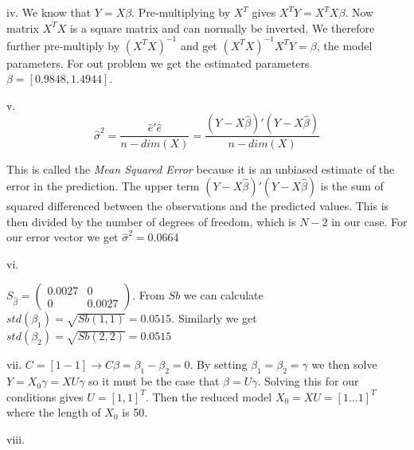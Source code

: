 \documentclass[11pt,a4paper,oneside]{report}
\begin{document}
iv. We know that $Y = X\beta$. Pre-multiplying by $X^T$ gives $X^TY = X^TX\beta$. Now matrix $X^TX$ is a square matrix and can normally be inverted. We therefore further pre-multiply by $(X^TX)^{-1}$ and get $(X^TX)^{-1}X^TY = \beta$, the model parameters. For out problem we get the estimated parameters $\beta = [0.9848, 1.4944]$.

v. $$\hat{\sigma}^2 = \frac{\hat{e}'\hat{e}}{n - dim(X)} = \frac{(Y - X\hat{\beta})'(Y - X\hat{\beta})}{n - dim(X)}$$

This is called the \emph{Mean Squared Error} because it is an unbiased estimate of the error in the prediction. The upper term $(Y - X\hat{\beta})'(Y - X\hat{\beta})$ is the sum of squared differenced between the observations and the predicted values. This is then divided by the number of degrees of freedom, which is $N - 2$ in our case. For our error vector we get $\hat{\sigma}^2 = 0.0664$

vi.

$S_{\hat{\beta}} = \begin{pmatrix}
0.0027 & 0\\
0 & 0.0027
\end{pmatrix}$. From $Sb$ we can calculate $std(\beta_1) = \sqrt{Sb(1,1)} = 0.0515$. Similarly we get  $std(\beta_2) = \sqrt{Sb(2,2)} = 0.0515$

vii. $C = [1 -1] \to C\beta = \beta_1 - \beta_2 = 0$. By setting $\beta_1 = \beta_2 = \gamma$ we then solve $Y = X_0\gamma = XU\gamma$ so it must be the case that $\beta = U\gamma$. Solving this for our conditions gives $U = [1, 1]^T$. Then the reduced model $X_0 = XU = [1 \dots 1]^T $ where the length of $X_0$ is 50. 


viii. 
\end{document}
